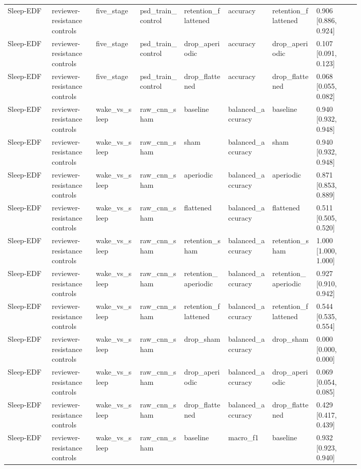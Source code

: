 \begin{longtable}{p{0.10\linewidth}p{0.10\linewidth}p{0.10\linewidth}p{0.10\linewidth}p{0.10\linewidth}p{0.10\linewidth}p{0.10\linewidth}p{0.10\linewidth}}
Sleep-EDF & reviewer-resistance controls & five\_stage & psd\_train\_control & retention\_flattened & accuracy & retention\_flattened & 0.906 [0.886, 0.924]\\
Sleep-EDF & reviewer-resistance controls & five\_stage & psd\_train\_control & drop\_aperiodic & accuracy & drop\_aperiodic & 0.107 [0.091, 0.123]\\
Sleep-EDF & reviewer-resistance controls & five\_stage & psd\_train\_control & drop\_flattened & accuracy & drop\_flattened & 0.068 [0.055, 0.082]\\
Sleep-EDF & reviewer-resistance controls & wake\_vs\_sleep & raw\_cnn\_sham & baseline & balanced\_accuracy & baseline & 0.940 [0.932, 0.948]\\
Sleep-EDF & reviewer-resistance controls & wake\_vs\_sleep & raw\_cnn\_sham & sham & balanced\_accuracy & sham & 0.940 [0.932, 0.948]\\
Sleep-EDF & reviewer-resistance controls & wake\_vs\_sleep & raw\_cnn\_sham & aperiodic & balanced\_accuracy & aperiodic & 0.871 [0.853, 0.889]\\
Sleep-EDF & reviewer-resistance controls & wake\_vs\_sleep & raw\_cnn\_sham & flattened & balanced\_accuracy & flattened & 0.511 [0.505, 0.520]\\
Sleep-EDF & reviewer-resistance controls & wake\_vs\_sleep & raw\_cnn\_sham & retention\_sham & balanced\_accuracy & retention\_sham & 1.000 [1.000, 1.000]\\
Sleep-EDF & reviewer-resistance controls & wake\_vs\_sleep & raw\_cnn\_sham & retention\_aperiodic & balanced\_accuracy & retention\_aperiodic & 0.927 [0.910, 0.942]\\
Sleep-EDF & reviewer-resistance controls & wake\_vs\_sleep & raw\_cnn\_sham & retention\_flattened & balanced\_accuracy & retention\_flattened & 0.544 [0.535, 0.554]\\
Sleep-EDF & reviewer-resistance controls & wake\_vs\_sleep & raw\_cnn\_sham & drop\_sham & balanced\_accuracy & drop\_sham & 0.000 [0.000, 0.000]\\
Sleep-EDF & reviewer-resistance controls & wake\_vs\_sleep & raw\_cnn\_sham & drop\_aperiodic & balanced\_accuracy & drop\_aperiodic & 0.069 [0.054, 0.085]\\
Sleep-EDF & reviewer-resistance controls & wake\_vs\_sleep & raw\_cnn\_sham & drop\_flattened & balanced\_accuracy & drop\_flattened & 0.429 [0.417, 0.439]\\
Sleep-EDF & reviewer-resistance controls & wake\_vs\_sleep & raw\_cnn\_sham & baseline & macro\_f1 & baseline & 0.932 [0.923, 0.940]\\

\end{longtable}
